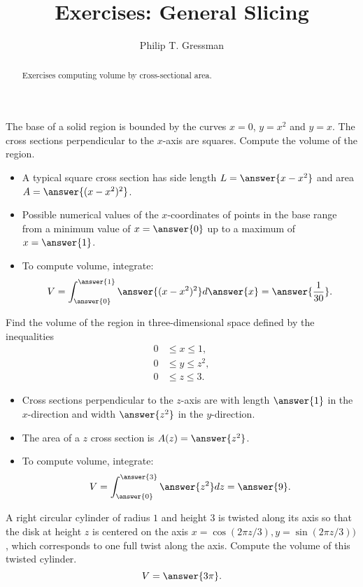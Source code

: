 \documentclass{ximera}
\title{Exercises: General Slicing}
\author{Philip T. Gressman}
\begin{document}
\begin{abstract}
Exercises computing volume by cross-sectional area.
\end{abstract}
\maketitle

\begin{exercise}
The base of a solid region is bounded by the curves $x = 0$, $y = x^2$ and $y = x$. The cross sections perpendicular to the $x$-axis are squares. Compute the volume of the region.
\begin{itemize}
\item A typical square cross section has side length $L = \answer{x - x^2}$ and area $A = \answer{(x-x^2)^2}$. 
\item Possible numerical values of the $x$-coordinates of points in the base range from a minimum value of $x = \answer{0}$ up to a maximum of $x = \answer{1}$.
\item To compute volume, integrate:
\[ V = \int_{\answer{0}}^{\answer{1}} \answer{(x-x^2)^2} d\answer{x} = \answer{\frac{1}{30}}. \]
\end{itemize}
\end{exercise}

\begin{exercise}
Find the volume of the region in three-dimensional space defined by the inequalities
\begin{align*}
0 & \leq x \leq 1, \\
0 & \leq y \leq z^2, \\
0 & \leq z \leq 3.
\end{align*}
\begin{itemize}
\item Cross sections perpendicular to the $z$-axis are  with length $\answer{1}$ in the $x$-direction and width $\answer{z^2}$ in the $y$-direction.
\item The area of a $z$ cross section is $A(z) = \answer{z^2}$.
\item To compute volume, integrate:
\[ V = \int_{\answer{0}}^{\answer{3}} \answer{z^2} dz = \answer{9}. \]
\end{itemize}
\end{exercise}

\begin{exercise}
A right circular cylinder of radius $1$ and height $3$ is twisted along its axis so that the disk at height $z$ is centered on the axis $ x = \cos (2 \pi z/3), y = \sin (2 \pi z/3))$, which corresponds to one full twist along the axis. Compute the volume of this twisted cylinder.
\[ V = \answer{3 \pi}. \]
\end{exercise}
\end{document}

